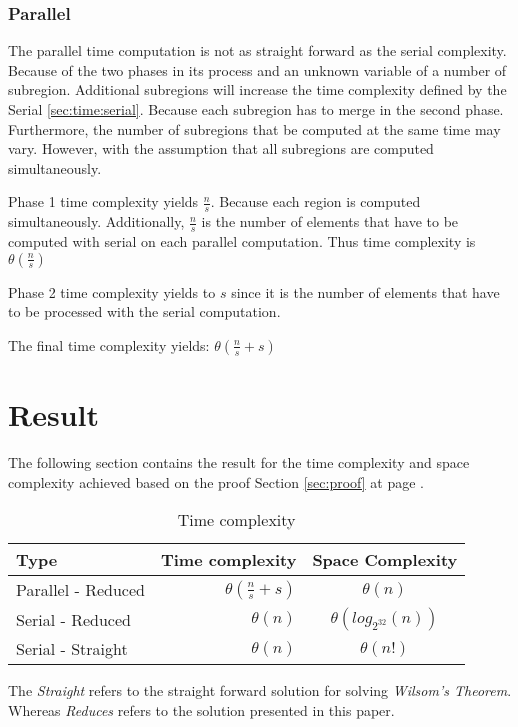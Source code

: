 \documentclass[12pt, oneside, onecolumn]{article}
\begin{document}
\subsubsection{Parallel}
The parallel time computation is not as straight forward as the serial complexity. Because of the two phases in its process and an unknown variable of a number of subregion. Additional subregions will increase the time complexity defined by the Serial \ref{sec:time:serial}. Because each subregion has to merge in the second phase. Furthermore, the number of subregions that be computed at the same time may vary. However, with the assumption that all subregions are computed simultaneously.

%
Phase 1 time complexity yields $\frac{n}{s}$. Because each region is computed simultaneously. Additionally, $\frac{n}{s}$ is the number of elements that have to be computed with serial on each parallel computation. Thus time complexity is $\theta(\frac{n}{s})$

%
Phase 2 time complexity yields to $s$ since it is the number of elements that have to be processed with the serial computation.

The final time complexity yields: $\theta(\frac{n}{s} + s)$

\newpage
\section{Result}
The following section contains the result for the time complexity and space complexity achieved based on the proof Section \ref{sec:proof} at page \pageref{sec:proof}.

\begin{table}[!h]
\centering
\begin{tabular}{ | l | r | c | }
\hline
Type & Time complexity  & Space Complexity				 										\\ \hline
Parallel - Reduced 	& $\theta(\frac{n}{s} + s)$ 				& $\theta(n)$				  	\\ \hline
Serial - Reduced 	& $\theta(n)$ 								& $\theta(log_{2^{32}}(n))$	\\ \hline
Serial - Straight 	& $\theta(n)$ 								& $\theta(n!)$ 					\\ \hline
\end{tabular}
\caption{Time complexity}
\label{tab:res}
\end{table}
The \emph{Straight} refers to the straight forward solution for solving\emph{ Wilsom's Theorem}. Whereas \emph{Reduces} refers to the solution presented in this paper.
\end{document}
